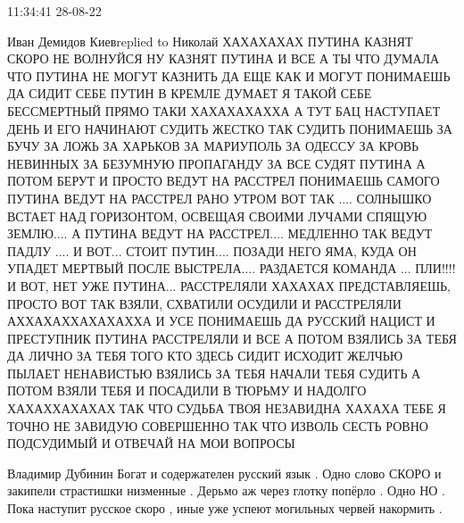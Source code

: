  
 
 
 
 

11:34:41 28-08-22

Иван Демидов Киевreplied to Николай
ХАХАХАХАХ ПУТИНА КАЗНЯТ СКОРО НЕ ВОЛНУЙСЯ НУ КАЗНЯТ ПУТИНА И
ВСЕ А ТЫ ЧТО ДУМАЛА ЧТО ПУТИНА НЕ МОГУТ КАЗНИТЬ ДА ЕЩЕ КАК И
МОГУТ ПОНИМАЕШЬ ДА СИДИТ СЕБЕ ПУТИН В КРЕМЛЕ ДУМАЕТ Я ТАКОЙ
СЕБЕ БЕССМЕРТНЫЙ ПРЯМО ТАКИ ХАХАХАХАХХА А ТУТ БАЦ НАСТУПАЕТ
ДЕНЬ И ЕГО НАЧИНАЮТ СУДИТЬ ЖЕСТКО ТАК СУДИТЬ ПОНИМАЕШЬ ЗА
БУЧУ ЗА ЛОЖЬ ЗА ХАРЬКОВ ЗА МАРИУПОЛЬ ЗА ОДЕССУ ЗА КРОВЬ
НЕВИННЫХ ЗА БЕЗУМНУЮ ПРОПАГАНДУ ЗА ВСЕ СУДЯТ ПУТИНА А ПОТОМ
БЕРУТ И ПРОСТО ВЕДУТ НА РАССТРЕЛ ПОНИМАЕШЬ САМОГО ПУТИНА ВЕДУТ
НА РАССТРЕЛ РАНО УТРОМ ВОТ ТАК .... СОЛНЫШКО ВСТАЕТ НАД
ГОРИЗОНТОМ, ОСВЕЩАЯ СВОИМИ ЛУЧАМИ СПЯЩУЮ ЗЕМЛЮ.... А
ПУТИНА ВЕДУТ НА РАССТРЕЛ.... МЕДЛЕННО ТАК ВЕДУТ ПАДЛУ .... И ВОТ...
СТОИТ ПУТИН.... ПОЗАДИ НЕГО ЯМА, КУДА ОН УПАДЕТ МЕРТВЫЙ
ПОСЛЕ ВЫСТРЕЛА.... РАЗДАЕТСЯ КОМАНДА ... ПЛИ!!!! И ВОТ, НЕТ УЖЕ
ПУТИНА... РАССТРЕЛЯЛИ ХАХАХАХ ПРЕДСТАВЛЯЕШЬ, ПРОСТО ВОТ ТАК
ВЗЯЛИ, СХВАТИЛИ ОСУДИЛИ И РАССТРЕЛЯЛИ АХХАХАХХАХАХАХХА
И УСЕ ПОНИМАЕШЬ ДА РУССКИЙ НАЦИСТ И ПРЕСТУПНИК ПУТИНА
РАССТРЕЛЯЛИ И ВСЕ А ПОТОМ ВЗЯЛИСЬ ЗА ТЕБЯ ДА ЛИЧНО ЗА ТЕБЯ
ТОГО КТО ЗДЕСЬ СИДИТ ИСХОДИТ ЖЕЛЧЬЮ ПЫЛАЕТ НЕНАВИСТЬЮ
ВЗЯЛИСЬ ЗА ТЕБЯ НАЧАЛИ ТЕБЯ СУДИТЬ А ПОТОМ ВЗЯЛИ ТЕБЯ И
ПОСАДИЛИ В ТЮРЬМУ И НАДОЛГО ХАХАХХАХАХАХ ТАК ЧТО СУДЬБА
ТВОЯ НЕЗАВИДНА ХАХАХА ТЕБЕ Я ТОЧНО НЕ ЗАВИДУЮ СОВЕРШЕННО
ТАК ЧТО ИЗВОЛЬ СЕСТЬ РОВНО ПОДСУДИМЫЙ И ОТВЕЧАЙ НА МОИ
ВОПРОСЫ

Владимир Дубинин
Богат и содержателен русский язык . Одно слово СКОРО и закипели страстишки низменные . Дерьмо аж через глотку попёрло . Одно НО . Пока наступит русское скоро , иные уже успеют могильных червей накормить .

